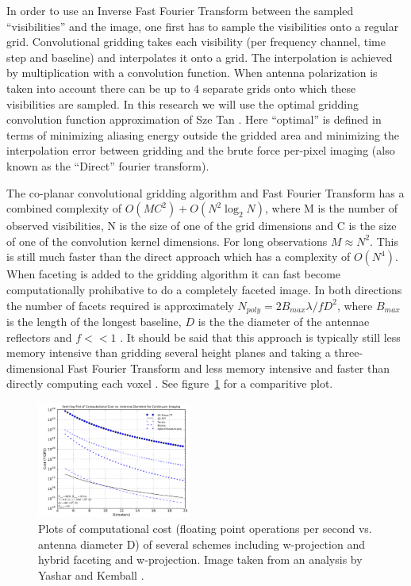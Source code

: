 \documentclass[a4paper, two column]{article}
\begin{document}
 In order to use an Inverse Fast Fourier Transform between the sampled ``visibilities'' and the image, one first has to sample the visibilities onto a regular grid. Convolutional gridding takes each visibility (per frequency channel, time step and baseline) 
 and interpolates it onto a grid. The interpolation is achieved by multiplication with a convolution function. When antenna polarization is taken into account there can be up to 4 separate grids onto which these visibilities are sampled. In this research we will
 use the optimal gridding convolution function approximation of Sze Tan \cite{tan1986aperture}. Here ``optimal'' is defined in terms of minimizing aliasing energy outside the gridded area and minimizing the interpolation error between gridding and the brute force per-pixel
 imaging (also known as the ``Direct'' fourier transform).
 
 The co-planar convolutional gridding algorithm and Fast Fourier Transform has a combined complexity of $O(MC^2) + O(N^2\log_2{N})$, where M is the number of observed visibilities, N is the size of one of the grid dimensions and C is the size of one of the convolution kernel 
 dimensions. For long observations $M\approx N^2$. This is still much faster than the direct approach which has a complexity of $O(N^4)$. When faceting is added to the gridding algorithm it can fast become computationally prohibative to do a completely faceted image. In both directions 
 the number of facets required is approximately $N_{poly}=2B_{max}\lambda/fD^2$, where $B_{max}$ is the length of the longest baseline, $D$ is the the diameter of the antennae reflectors and $f << 1$ \cite{taylor1999synthesis}. It should be said that this approach is typically
 still less memory intensive than gridding several height planes and taking a three-dimensional Fast Fourier Transform and less memory intensive and faster than directly computing each voxel \cite{yashar2009tdp}. See figure~\ref{IMG_PERFORMANCE_COMPARISON} for a comparitive plot.
 \begin{figure}
  \includegraphics[width=0.45\textwidth]{performance_faceting.png}
  \caption{Plots of computational cost (floating point operations per second vs. antenna diameter D) of several schemes including w-projection and hybrid faceting and w-projection. Image taken from an analysis by Yashar and Kemball \cite{yashar2009tdp}.}
  \label{IMG_PERFORMANCE_COMPARISON}
 \end{figure}
\end{document}
